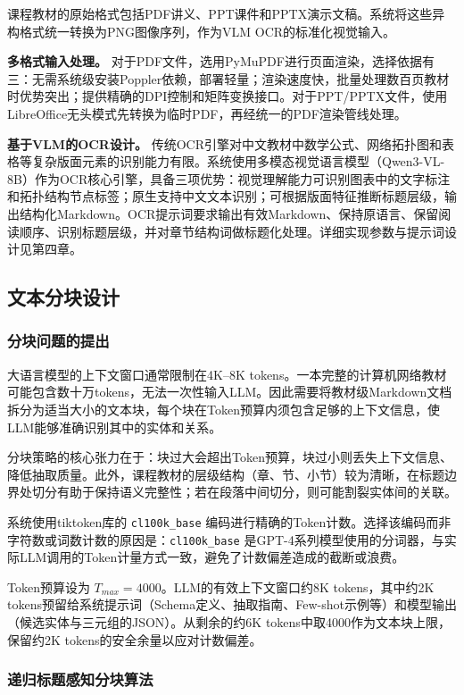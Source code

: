 课程教材的原始格式包括PDF讲义、PPT课件和PPTX演示文稿。系统将这些异构格式统一转换为PNG图像序列，作为VLM OCR的标准化视觉输入。

\textbf{多格式输入处理。} 对于PDF文件，选用PyMuPDF进行页面渲染，选择依据有三：无需系统级安装Poppler依赖，部署轻量；渲染速度快，批量处理数百页教材时优势突出；提供精确的DPI控制和矩阵变换接口。对于PPT/PPTX文件，使用LibreOffice无头模式先转换为临时PDF，再经统一的PDF渲染管线处理。

\textbf{基于VLM的OCR设计。} 传统OCR引擎对中文教材中数学公式、网络拓扑图和表格等复杂版面元素的识别能力有限。系统使用多模态视觉语言模型（Qwen3-VL-8B）作为OCR核心引擎，具备三项优势：视觉理解能力可识别图表中的文字标注和拓扑结构节点标签；原生支持中文文本识别；可根据版面特征推断标题层级，输出结构化Markdown。OCR提示词要求输出有效Markdown、保持原语言、保留阅读顺序、识别标题层级，并对章节结构词做标题化处理。详细实现参数与提示词设计见第四章。

\subsection{文本分块设计}

\subsubsection{分块问题的提出}

大语言模型的上下文窗口通常限制在4K--8K tokens。一本完整的计算机网络教材可能包含数十万tokens，无法一次性输入LLM。因此需要将教材级Markdown文档拆分为适当大小的文本块，每个块在Token预算内须包含足够的上下文信息，使LLM能够准确识别其中的实体和关系。

分块策略的核心张力在于：块过大会超出Token预算，块过小则丢失上下文信息、降低抽取质量。此外，课程教材的层级结构（章、节、小节）较为清晰，在标题边界处切分有助于保持语义完整性；若在段落中间切分，则可能割裂实体间的关联。

系统使用tiktoken库的 \texttt{cl100k\_base} 编码进行精确的Token计数。选择该编码而非字符数或词数计数的原因是：\texttt{cl100k\_base} 是GPT-4系列模型使用的分词器，与实际LLM调用的Token计量方式一致，避免了计数偏差造成的截断或浪费。

Token预算设为 $T_{max} = 4000$。LLM的有效上下文窗口约8K tokens，其中约2K tokens预留给系统提示词（Schema定义、抽取指南、Few-shot示例等）和模型输出（候选实体与三元组的JSON）。从剩余的约6K tokens中取4000作为文本块上限，保留约2K tokens的安全余量以应对计数偏差。

\subsubsection{递归标题感知分块算法}

